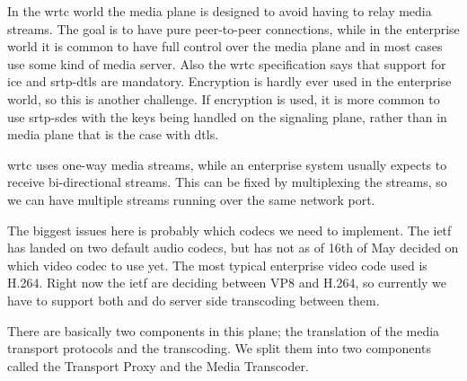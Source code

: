 In the \gls{wrtc} world the media plane is designed to avoid having to relay media streams. The goal is to have pure peer-to-peer connections, while in the enterprise world it is common to have full control over the media plane and in most cases use some kind of media server. Also the \gls{wrtc} specification says that support for \gls{ice} and \gls{srtp}-\gls{dtls} are mandatory. Encryption is hardly ever used in the enterprise world, so this is another challenge. If encryption is used, it is more common to use \gls{srtp}-\gls{sdes} with the keys being handled on the signaling plane, rather than in media plane that is the case with \gls{dtls}.

\gls{wrtc} uses one-way media streams, while an enterprise system usually expects to receive bi-directional streams. This can be fixed by multiplexing the streams, so we can have multiple streams running over the same network port.

The biggest issues here is probably which codecs we need to implement. The \gls{ietf} has landed on two default audio codecs, but has not as of 16th of May decided on which video codec to use yet. The most typical enterprise video code used is H.264. Right now the \gls{ietf} are deciding between VP8 and H.264, so currently we have to support both and do server side transcoding between them.

There are basically two components in this plane; the translation of the media transport protocols and the transcoding. We split them into two components called the Transport Proxy and the Media Transcoder.